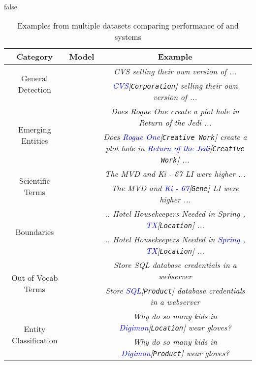 \if false
\begin{table*}[h!]
\centering
\begin{small}
\begin{tabular}{ccc}\toprule
Category & Model & Example \\\toprule
\multirow{2}{*}{General Detection} & \bertqa{} & \textit{CVS selling their own version of ...} \\
    & \modelname{} & \textit{\textcolor{blue}{CVS}[\texttt{Corporation}] selling their own version of ...} \\ \midrule
\multirow{2}{*}{Emerging Entities} & \bertqa{} & \textit{Does Rogue One create a plot hole in Return of the Jedi ... } \\
    & \modelname{} & \textit{Does \textcolor{blue}{Rogue One}[\texttt{Creative Work}] create a plot hole in \textcolor{blue}{Return of the Jedi}[\texttt{Creative Work}] ... } \\ \midrule
\multirow{2}{*}{Scientific Terms} & \bertqa{} & \textit{The MVD and Ki - 67 LI were higher ... } \\
    & \modelname{} & \textit{The MVD and \textcolor{blue}{Ki - 67}[\texttt{Gene}] LI were higher ...} \\ \midrule
\multirow{2}{*}{Boundaries} & \bertqa{} & \textit{.. Hotel Housekeepers Needed in Spring , \textcolor{blue}{TX}[\texttt{Location}] ... } \\
    & \modelname{} & \textit{.. Hotel Housekeepers Needed in \textcolor{blue}{Spring , TX}[\texttt{Location}] ... } \\ \midrule
\multirow{2}{*}{Out of Vocab Terms} & \bertqa{} & \textit{Store SQL database credentials in a webserver} \\
    & \modelname{} & \textit{Store \textcolor{blue}{SQL}[\texttt{Product}] database credentials in a webserver} \\ \midrule
\multirow{2}{*}{Entity Classification} & \bertqa{} & \textit{Why do so many kids in \textcolor{blue}{Digimon}[\texttt{Location}] wear gloves?} \\
    & \modelname{} & \textit{Why do so many kids in \textcolor{blue}{Digimon}[\texttt{Product}] wear gloves?} \\ \bottomrule
\end{tabular}
\caption{Examples from multiple datasets comparing performance of \modelname{} and \bertqa{} systems}
    \label{tab:quality}
\end{small}
\end{table*}


